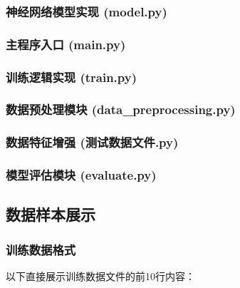 \documentclass{article}
\begin{document}
\subsubsection{神经网络模型实现 (model.py)}


\subsubsection{主程序入口 (main.py)}


\subsubsection{训练逻辑实现 (train.py)}


\subsubsection{数据预处理模块 (data\_preprocessing.py)}


\subsubsection{数据特征增强 (测试数据文件.py)}


\subsubsection{模型评估模块 (evaluate.py)}


\subsection{数据样本展示}
\subsubsection{训练数据格式}
以下直接展示训练数据文件的前10行内容：
\end{document}
